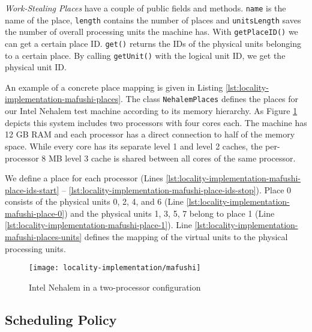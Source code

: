\emph{Work-Stealing Places} have a couple of public fields and
methods. \lstinline!name! is the name of the place, \lstinline!length!
contains the number of places and \lstinline!unitsLength! saves the
number of overall processing units the machine has. With
\lstinline!getPlaceID()!  we can get a certain place
ID. \lstinline!get()! returns the IDs of the physical units belonging
to a certain place. By calling \lstinline!getUnit()! with the logical
unit ID, we get the physical unit ID.

An example of a concrete place mapping is given in Listing
\ref{lst:locality-implementation-mafushi-places}. The class
\lstinline!NehalemPlaces! defines the places for our Intel Nehalem
test machine according to its memory hierarchy. As Figure
\ref{fig:locality-implemenation-work-stealing-places-mafushi} depicts
this system includes two processors with four cores each. The machine
has 12 GB RAM and each processor has a direct connection to half of
the memory space. While every core has its separate level 1 and level
2 caches, the per-processor 8 MB level 3 cache is shared between all
cores of the same processor.



We define a place for each processor (Lines
\ref{lst:locality-implementation-mafushi-place-ids-start} --
\ref{lst:locality-implementation-mafushi-place-ids-stop}). Place 0
consists of the physical units 0, 2, 4, and 6 (Line
\ref{lst:locality-implementation-mafushi-place-0}) and the physical
units 1, 3, 5, 7 belong to place 1 (Line
\ref{lst:locality-implementation-mafushi-place-1}). Line
\ref{lst:locality-implementation-mafushi-places-units} defines the
mapping of the virtual units to the physical processing units.

\begin{figure}[!htb]
  \centering
  \texttt{[image: locality-implementation/mafushi]}
  \caption[Intel Nehalem in a two-processor configuration]{Intel
    Nehalem in a two-processor configuration}
  \label{fig:locality-implemenation-work-stealing-places-mafushi}
\end{figure}

\subsection{Scheduling Policy}
\label{sec:locality-implementation-work-stealing-places-scheduling}

